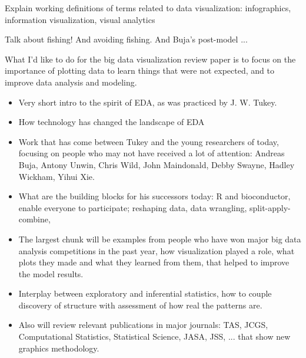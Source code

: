 \documentclass{article}
\begin{document}
Explain working definitions of terms related to data visualization: infographics, information visualization, visual analytics

Talk about fishing! And avoiding fishing. And Buja's post-model ...

What I'd like to do for the big data visualization review paper is to focus on the importance of plotting data to learn things that were not expected, and to improve data analysis and modeling.

\begin{itemize} \itemsep 0in
\item Very short intro to the spirit of EDA, as was practiced by J. W. Tukey.

\item How technology has changed the landscape of EDA

\item Work that has come between Tukey and the young researchers of today, focusing on people who may not have received a lot of attention: Andreas Buja, Antony Unwin, Chris Wild, John Maindonald, Debby Swayne, Hadley Wickham, Yihui Xie.

\item What are the building blocks for his successors today: R and bioconductor, enable everyone to participate; reshaping data, data wrangling, split-apply-combine,

\item The largest chunk will be examples from people who have won major big data analysis competitions in the past year, how visualization played a role,  what plots they made and what they learned from them, that helped to improve the model results.

\item Interplay between exploratory and inferential statistics, how to couple discovery of structure with assessment of how real the patterns are.

\item Also will review relevant publications in major journals: TAS, JCGS, Computational Statistics, Statistical Science, JASA, JSS, ... that show new graphics methodology.

\end{itemize}



\end{document}
